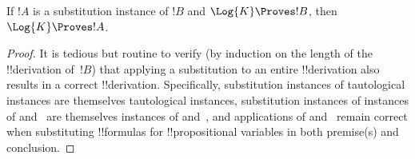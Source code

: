 \documentclass[../../../include/open-logic-section]{subfiles}
\begin{document}
\begin{prop}
  If $!A$ is a substitution instance of $!B$ and $\Log{K} \Proves !B$,
  then $\Log{K} \Proves !A$.
\end{prop}

\begin{proof}
  It is tedious but routine to verify (by induction on the length of
  the !!{derivation} of~$!B$) that applying a substitution to an
  entire !!{derivation} also results in a correct
  !!{derivation}. Specifically, substitution instances of tautological
  instances are themselves tautological instances, substitution
  instances of instances of \Dual{} and~ are themselves
  instances of \Dual{} and~, and applications of \MP{}
  and~\Nec{} remain correct when substituting !!{formula}s for
  !!{propositional variable}s in both premise(s) and conclusion.
\end{proof}
\end{document}
